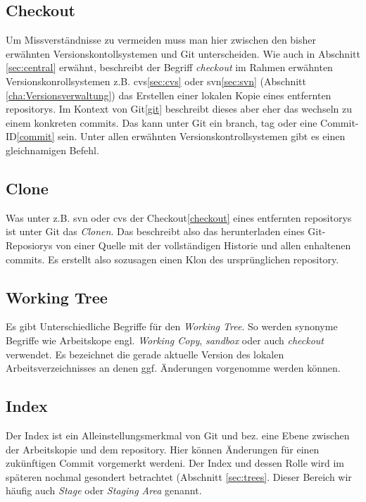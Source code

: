 \subsection{Checkout}\label{sec:checkout}
Um Missverständnisse zu vermeiden muss man hier zwischen den bisher erwähnten
Versionskontollsystemen und Git unterscheiden. Wie auch in Abschnitt
\ref{sec:central} erwähnt, beschreibt der Begriff \textit{checkout} im Rahmen
erwähnten Versionskonrollsystemen z.B. \acrshort{cvs}\ref{sec:cvs} oder
\acrshort{svn}\ref{sec:svn} (Abschnitt \ref{cha:Versionsverwaltung}) das
Erstellen einer lokalen Kopie eines entfernten \glspl{repository}. Im Kontext von
Git\ref{git} beschreibt dieses aber eher das wechseln zu einem konkreten
\glspl{commit}. Das kann unter Git ein \gls{branch}, \gls{tag} oder eine
Commit-ID\ref{commit} sein. Unter allen erwähnten Versionskontrollsystemen gibt
es einen gleichnamigen Befehl.

\subsection{Clone}\label{sec:clone}
Was unter z.B. \acrshort{svn} oder \acrshort{cvs} der Checkout\ref{checkout}
eines entfernten \glspl{repository} ist unter Git das \textit{Clonen}. Das
beschreibt also das herunterladen eines Git-Reposiorys von einer Quelle mit der
vollständigen Historie und allen enhaltenen \glspl{commit}. Es erstellt
also sozusagen einen Klon des ursprünglichen \gls{repository}.\cite[S.~21]{gitosp}

\subsection{Working Tree}\label{sec:workingtree}
Es gibt Unterschiedliche Begriffe für den \textit{Working Tree}. So werden
synonyme Begriffe wie Arbeitskope engl. \textit{Working Copy}, \textit{sandbox}
oder auch \textit{checkout} verwendet. Es bezeichnet die gerade aktuelle
Version des lokalen Arbeitsverzeichnisses an denen ggf. Änderungen vorgenomme
werden können.\cite[S.~20]{gitosp}

\subsection{Index}\label{sec:index}
Der Index ist ein Alleinstellungsmerkmal von Git und bez. eine Ebene zwischen
der Arbeitskopie und dem \gls{repository}. Hier können Änderungen für einen
zukünftigen Commit vorgemerkt werdeni\cite[S.~20]{gitosp}. Der Index und dessen
Rolle wird im späteren nochmal gesondert betrachtet (Abschnitt \ref{sec:trees}.
Dieser Bereich wir häufig auch \textit{Stage} oder \textit{Staging Area}
genannt\cite[S.~11]{progit}.

